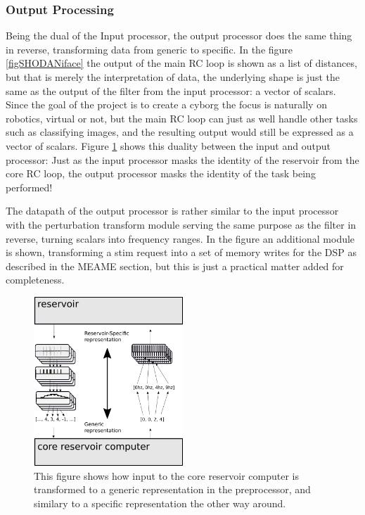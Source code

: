 \subsubsection{Output Processing}
Being the dual of the Input processor, the output processor does the same thing
in reverse, transforming data from generic to specific.
In the figure \ref{figSHODANiface} the output of the main RC loop is shown as a
list of distances, but that is merely the interpretation of data, the underlying
shape is just the same as the output of the filter from the input processor: a
vector of scalars.
Since the goal of the project is to create a cyborg the focus is naturally on
robotics, virtual or not, but the main RC loop can just as well handle other
tasks such as classifying images, and the resulting output would still be
expressed as a vector of scalars.
Figure \ref{figGenericSpecific} shows this duality between the input and output
processor: Just as the input processor masks the identity of the reservoir from
the core RC loop, the output processor masks the identity of the task being
performed!\par
The datapath of the output processor is rather similar to the input processor
with the perturbation transform module serving the same purpose as the filter in
reverse, turning scalars into frequency ranges.
In the figure an additional module is shown, transforming a stim request into a
set of memory writes for the DSP as described in the MEAME section, but this is
just a practical matter added for completeness.
\begin{figure}[h!]
  \centering
  \includegraphics[width=0.5\textwidth]{fig/genericSpecific.png}
  \caption{
    This figure shows how input to the core reservoir computer is transformed to
    a generic representation in the preprocessor, and similary to a specific
    representation the other way around.
  }
  \label{figGenericSpecific}
\end{figure}
